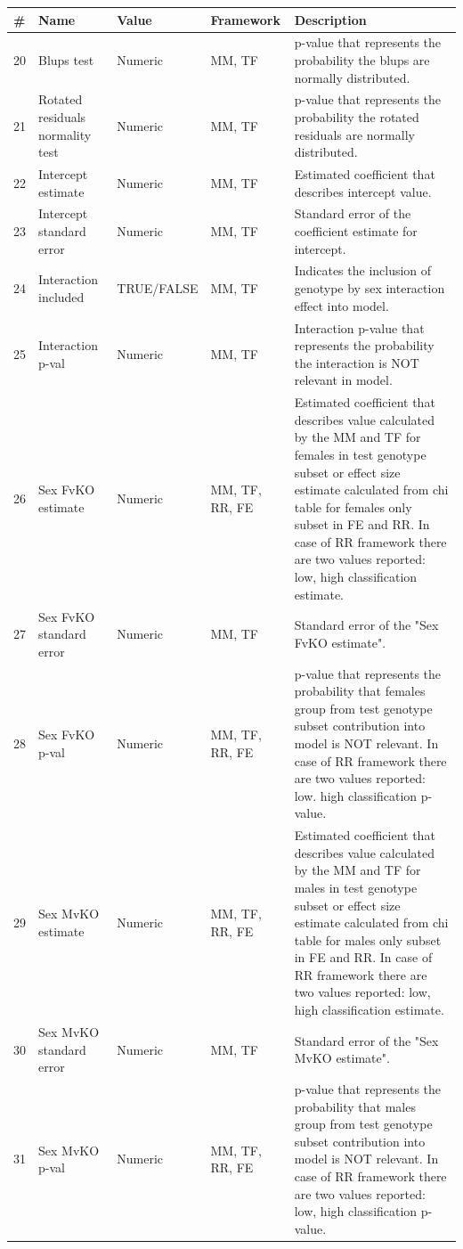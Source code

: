 \documentclass[12pt,a4paper]{article}
\begin{document}
\begin{table}
 
\begin{tabular}{| l | l | l | l | p{10cm} |}
  \hline
\#&Name&Value&Framework&Description\\\hline
20&Blups test&Numeric&MM, TF&p-value that represents the probability the blups are normally distributed.\\
21&Rotated residuals normality test&Numeric&MM, TF&p-value that represents the probability the rotated residuals are normally distributed.\\
22&Intercept estimate&Numeric&MM, TF&Estimated coefficient that describes intercept value.\\
23&Intercept standard error&Numeric&MM, TF&Standard error of the coefficient estimate for intercept.\\
24&Interaction included&TRUE/FALSE&MM, TF&Indicates the inclusion of genotype by sex interaction effect into model.\\
25&Interaction p-val&Numeric&MM, TF&Interaction p-value that represents the probability the interaction is NOT relevant in model.\\
26&Sex FvKO estimate&Numeric&MM, TF, RR, FE&Estimated coefficient that describes value calculated by the MM and TF for females in test genotype subset or effect size estimate calculated from chi table for females only subset in FE and RR. In case of RR framework there are two values reported: low, high classification estimate.\\
27&Sex FvKO standard error&Numeric&MM, TF&Standard error of the "Sex FvKO estimate".\\
28&Sex FvKO p-val&Numeric&MM, TF, RR, FE&p-value that represents the probability that females group from test genotype subset contribution into model is NOT relevant. In case of RR framework there are two values reported: low. high classification p-value.\\
29&Sex MvKO estimate&Numeric&MM, TF, RR, FE&Estimated coefficient that describes value calculated by the MM and TF for males in test genotype subset or effect size estimate calculated from chi table for males only subset in FE and RR. In case of RR framework there are two values reported: low, high classification estimate.\\
30&Sex MvKO standard error&Numeric&MM, TF&Standard error of the "Sex MvKO estimate".\\
31&Sex MvKO p-val&Numeric&MM, TF, RR, FE&p-value that represents the probability that males group from test genotype subset contribution into model is NOT relevant. In case of RR framework there are two values reported: low, high classification p-value.\\

\end{tabular}
\end{table}
\end{document}
